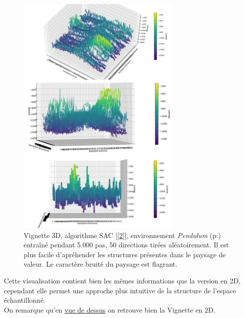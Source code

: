 \documentclass[12pt]{article}
\begin{document}
\begin{figure}[htp]
    \centering
    \includegraphics[width=8cm]{Images/vignette_3D}
    \caption{Vignette 3D, algorithme SAC  \ref{[2]}, environnement \emph{Pendulum} (p:\pageref{second}) entraîné pendant 5.000 pas, 50 directions tirées aléatoirement. Il est plus facile d'apréhender les structures présentes dans le paysage de valeur. Le caractère bruité du paysage est flagrant.}
    \label{fig:vignette3D}
\end{figure}

Cette visualisation contient bien les mêmes informations que la version en 2D, cependant elle permet une approche plus intuitive de la structure de l'espace échantillonné. \\

On remarque qu'en \hyperref[fig:vignetteDessus]{vue de dessus} on retrouve bien la Vignette en 2D. \\
\end{document}
